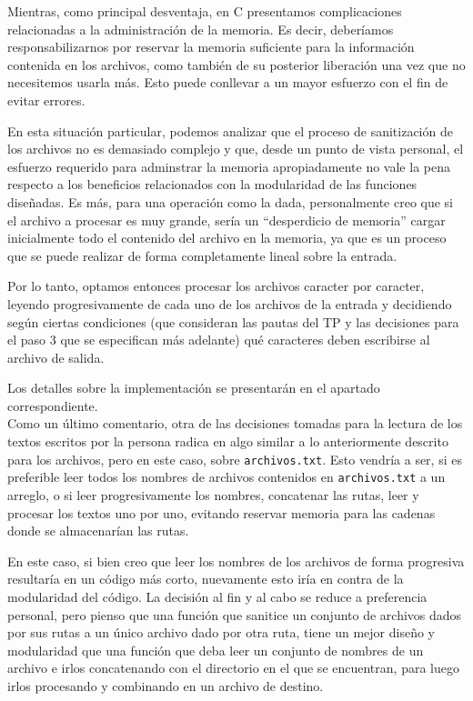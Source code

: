 \documentclass[a4paper]{article}
\begin{document}
Mientras, como principal desventaja, en C presentamos complicaciones relacionadas a la administración de la memoria. Es decir, deberíamos responsabilizarnos por reservar la memoria suficiente para la información contenida en los archivos, como también de su posterior liberación una vez que no necesitemos usarla más. Esto puede conllevar a un mayor esfuerzo con el fin de evitar errores.

En esta situación particular, podemos analizar que el proceso de sanitización de los archivos no es demasiado complejo y que, desde un punto de vista personal, el esfuerzo requerido para adminstrar la memoria apropiadamente no vale la pena respecto a los beneficios relacionados con la modularidad de las funciones diseñadas. Es más, para una operación como la dada, personalmente creo que si el archivo a procesar es muy grande, sería un  ``desperdicio de memoria'' cargar inicialmente todo el contenido del archivo en la memoria, ya que es un proceso que se puede realizar de forma completamente lineal sobre la entrada.

Por lo tanto, optamos entonces procesar los archivos caracter por caracter, leyendo progresivamente de cada uno de los archivos de la entrada y decidiendo según ciertas condiciones (que consideran las pautas del TP y las decisiones para el paso 3 que se especifican más adelante) qué caracteres deben escribirse al archivo de salida.

Los detalles sobre la implementación se presentarán en el apartado correspondiente. \\ %

Como un último comentario, otra de las decisiones tomadas para la lectura de los textos escritos por la persona radica en algo similar a lo anteriormente descrito para los archivos, pero en este caso, sobre \texttt{archivos.txt}. Esto vendría a ser, si es preferible leer todos los nombres de archivos contenidos en \texttt{archivos.txt} a un arreglo, o si leer progresivamente los nombres, concatenar las rutas, leer y procesar los textos uno por uno, evitando reservar memoria para las cadenas donde se almacenarían las rutas.

En este caso, si bien creo que leer los nombres de los archivos de forma progresiva resultaría en un código más corto, nuevamente esto iría en contra de la modularidad del código. La decisión al fin y al cabo se reduce a preferencia personal, pero pienso que una función que sanitice un conjunto de archivos dados por sus rutas a un único archivo dado por otra ruta, tiene un mejor diseño y modularidad que una función que deba leer un conjunto de nombres de un archivo e irlos concatenando con el directorio en el que se encuentran, para luego irlos procesando y combinando en un archivo de destino.
\end{document}
